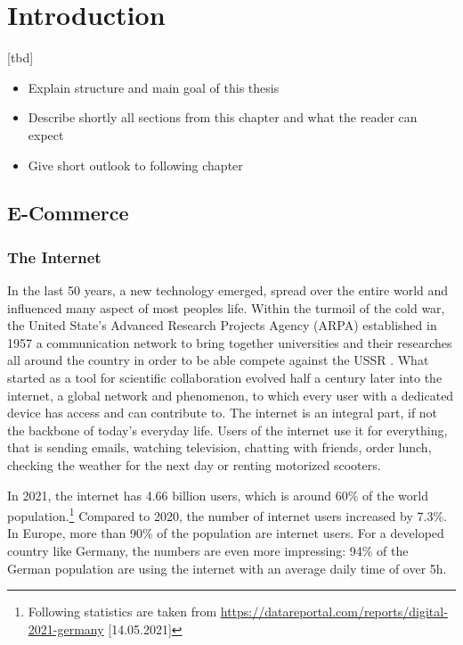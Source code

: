\chapter{Introduction}

[tbd]

\begin{itemize}
	\item Explain structure and main goal of this thesis
	\item Describe shortly all sections from this chapter and what the reader can expect
	\item Give short outlook to following chapter
\end{itemize}




\section{E-Commerce}


\subsection{The Internet}

In the last 50 years, a new technology emerged, spread over the entire world and influenced many aspect of most peoples life.
Within the turmoil of the cold war, the United State's Advanced Research Projects Agency (ARPA) established in 1957 a communication network to bring together universities and their researches all around the country in order to be able compete against the USSR \cite{2011Cohen}.
What started as a tool for scientific collaboration evolved half a century later into the internet, a global network and phenomenon, to which every user with a dedicated device has access and can contribute to.
The internet is an integral part, if not the backbone of today's everyday life.
Users of the internet use it for everything, that is sending emails, watching television, chatting with friends, 
order lunch, checking the weather for the next day or renting motorized scooters.


In 2021, the internet has 4.66 billion users, which is around 60\% of the world population.\footnote{Following statistics are taken from \url{https://datareportal.com/reports/digital-2021-germany} [14.05.2021]}
Compared to 2020, the number of internet users increased by 7.3\%.
In Europe, more than 90\% of the population are internet users.
For a developed country like Germany, the numbers are even more impressing:
94\% of the German population are using the internet with an average daily time of over 5h.

